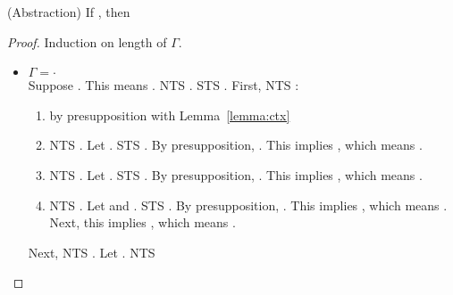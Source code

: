 \begin{lemma}\textnormal{(Abstraction)}\label{lemma:abs}
If , then 
\end{lemma}

\begin{proof}
Induction on length of $\Gamma$.
\begin{itemize}
    \item $\Gamma = \cdot$\\
    Suppose . This means
     .
     NTS . STS
     . First, NTS 
     :
     \begin{enumerate}
         \item {} by presupposition with Lemma~\ref{lemma:ctx}
         \item NTS . Let . STS 
         . By presupposition, . This implies
         , which means .
         \item NTS . Let . STS \isPot{[a/x]\varphi}. 
         By presupposition, .
         This implies \gammaToPot{\cdot}{[a/x]\varphi}, which means \isPot{[a/x]\varphi}.
         \item NTS . 
         Let  and . STS \isPot{[a/x,b/y]\varrho}. By presupposition, 
         . This implies 
         \gammaToPot{\cdot[\isOf{y}{[a/x]B}]}{[a/x]\varrho}, which means .
         Next, this implies \gammaToPot{\cdot}{[b/y][a/x]\varrho}, which means \isPot{[b/y][a/x]\varrho}. 
     \end{enumerate}
     Next, NTS .
     Let . NTS 
     \begin{enumerate}

\end{enumerate}
\end{itemize}
\end{proof}
